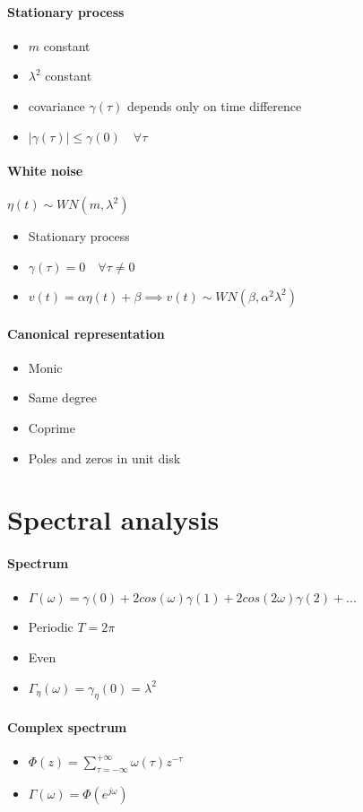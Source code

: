 \documentclass{report}
\begin{document}
\paragraph{Stationary process}
\begin{itemize}
	\item $m$ constant
	\item $\lambda^2$ constant
	\item covariance $\gamma(\tau)$ depends only on time difference
	\item $|\gamma(\tau)|\leq\gamma(0)		\quad\forall\tau$
\end{itemize}
\paragraph{White noise} $\eta(t)\sim WN(m,\lambda^2)$
\begin{itemize}
	\item Stationary process
	\item $\gamma(\tau)=0	\quad\forall\tau\neq0$
	\item $v(t)=\alpha \eta (t)+\beta\implies v(t)\sim WN(\beta,\alpha^2 \lambda^2)$
\end{itemize}
\paragraph{Canonical representation}
\begin{itemize}
\item Monic
\item Same degree
\item Coprime
\item Poles and zeros in unit disk
\end{itemize}
\section{Spectral analysis}
\paragraph{Spectrum}
\begin{itemize}
\item $\Gamma(\omega)=\gamma(0)+2cos(\omega)\gamma(1)+2cos(2\omega)\gamma(2)+...$
\item Periodic $T=2\pi$
\item Even
\item $\Gamma_\eta(\omega)=\gamma_\eta(0)=\lambda^2$
\end{itemize}
\paragraph{Complex spectrum}
\begin{itemize}
\item $\Phi(z)=\sum_{\tau =-\infty}^{+\infty} \omega(\tau)z^{-\tau}$
\item $\Gamma(\omega)=\Phi(e^{j\omega})$
\end{itemize}
\end{document}
